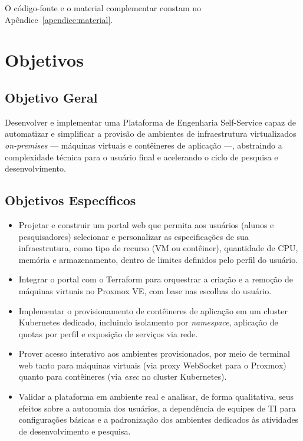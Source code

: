 \par O código-fonte e o material complementar constam no Apêndice~\ref{apendice:material}.

\section{Objetivos}

\subsection*{Objetivo Geral}
Desenvolver e implementar uma Plataforma de Engenharia Self-Service capaz de automatizar e simplificar a provisão de ambientes de infraestrutura virtualizados \textit{on-premises} — máquinas virtuais e contêineres de aplicação —, abstraindo a complexidade técnica para o usuário final e acelerando o ciclo de pesquisa e desenvolvimento.

\subsection*{Objetivos Específicos}
\begin{itemize}
    \item Projetar e construir um portal web que permita aos usuários (alunos e pesquisadores) selecionar e personalizar as especificações de sua infraestrutura, como tipo de recurso (VM ou contêiner), quantidade de CPU, memória e armazenamento, dentro de limites definidos pelo perfil do usuário.
    \item Integrar o portal com o Terraform para orquestrar a criação e a remoção de máquinas virtuais no Proxmox VE, com base nas escolhas do usuário.
    \item Implementar o provisionamento de contêineres de aplicação em um cluster Kubernetes dedicado, incluindo isolamento por \textit{namespace}, aplicação de quotas por perfil e exposição de serviços via rede.
    \item Prover acesso interativo aos ambientes provisionados, por meio de terminal web tanto para máquinas virtuais (via proxy WebSocket para o Proxmox) quanto para contêineres (via \textit{exec} no cluster Kubernetes).
    \item Validar a plataforma em ambiente real e analisar, de forma qualitativa, seus efeitos sobre a autonomia dos usuários, a dependência de equipes de TI para configurações básicas e a padronização dos ambientes dedicados às atividades de desenvolvimento e pesquisa.
\end{itemize}


\clearpage
